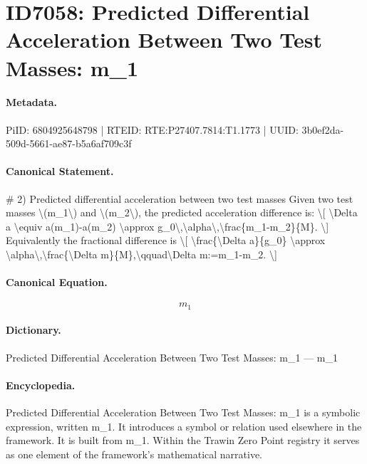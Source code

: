 \section*{ID7058: Predicted Differential Acceleration Between Two Test Masses: m\_1}
\paragraph{Metadata.}
PiID: 6804925648798 | RTEID: RTE:P27407.7814:T1.1773 | UUID: 3b0ef2da-509d-5661-ae87-b5a6af709c3f

\paragraph{Canonical Statement.}
\# 2) Predicted differential acceleration between two test masses Given two test masses \textbackslash{}(m\_1\textbackslash{}) and \textbackslash{}(m\_2\textbackslash{}), the predicted acceleration difference is: \textbackslash{}[ \textbackslash{}Delta a \textbackslash{}equiv a(m\_1)-a(m\_2) \textbackslash{}approx g\_0\textbackslash{},\textbackslash{}alpha\textbackslash{},\textbackslash{}frac\{m\_1-m\_2\}\{M\}. \textbackslash{}] Equivalently the fractional difference is \textbackslash{}[ \textbackslash{}frac\{\textbackslash{}Delta a\}\{g\_0\} \textbackslash{}approx \textbackslash{}alpha\textbackslash{},\textbackslash{}frac\{\textbackslash{}Delta m\}\{M\},\textbackslash{}qquad\textbackslash{}Delta m:=m\_1-m\_2. \textbackslash{}]

\paragraph{Canonical Equation.}
\[
m_1
\]

\paragraph{Dictionary.}
Predicted Differential Acceleration Between Two Test Masses: m\_1 — m\_1

\paragraph{Encyclopedia.}
Predicted Differential Acceleration Between Two Test Masses: m\_1 is a symbolic expression, written m\_1. It introduces a symbol or relation used elsewhere in the framework. It is built from m\_1. Within the Trawin Zero Point registry it serves as one element of the framework's mathematical narrative.
